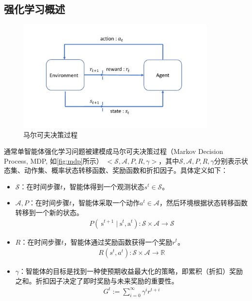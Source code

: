 \subsection{强化学习概述}
\begin{figure}[htb]
    \includegraphics[width=10cm]{fig/rl.pdf}
    \caption{马尔可夫决策过程}
    \label{fig:mdp}
\end{figure}
通常单智能体强化学习问题被建模成马尔可夫决策过程（Markov Decision Process, MDP, 如\autoref{fig:mdp}所示） $<\mathcal{S}, \mathcal{A}, P, R, \gamma>$，其中$\mathcal{S}, \mathcal{A}, P, R, \gamma$分别表示状态集、动作集、概率状态转移函数、奖励函数和折扣因子。具体定义如下：
\begin{itemize}
    \item $\mathcal{S}$：在时间步骤$t$，智能体得到一个观测状态$s^t \in \mathcal{S}$。
    \item $\mathcal{A}, P$：在时间步骤$t$，智能体采取一个动作$a^t \in \mathcal{A}$，然后环境根据状态转移函数转移到一个新的状态。
    \begin{align}
        P\left(\mathrm{~s}^{t+1} \mid \mathrm{s}^{t}, \mathrm{a}^{t}\right): \mathcal{S} \times \mathcal{A} \rightarrow \mathcal{S}
    \end{align}
    \item $R$：在时间步骤$t$，智能体通过奖励函数获得一个奖励$r^t$。
    \begin{align}
        R\left(s^{t}, a^{t}\right): \mathcal{S} \times \mathcal{A} \rightarrow \mathbb{R}
    \end{align}
    \item $\gamma$：智能体的目标是找到一种使预期收益最大化的策略，即累积（折扣）奖励之和。折扣因子决定了即时奖励与未来奖励的重要性。
    \begin{align}
        G^{t}:=\sum_{i=0}^{\infty} \gamma^{i} r^{t+i}
    \end{align}
  \end{itemize}
